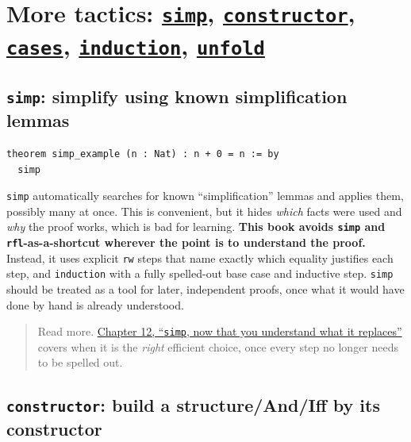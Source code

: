 \section{\texorpdfstring{More tactics: \href{https://lean-lang.org/doc/reference/latest/Tactic-Proofs/Tactic-Reference/}{\texttt{simp}}, \href{https://lean-lang.org/doc/reference/latest/Tactic-Proofs/Tactic-Reference/}{\texttt{constructor}}, \href{https://lean-lang.org/doc/reference/latest/Tactic-Proofs/Tactic-Reference/}{\texttt{cases}}, \href{https://lean-lang.org/doc/reference/latest/Tactic-Proofs/Tactic-Reference/}{\texttt{induction}}, \href{https://lean-lang.org/doc/reference/latest/Tactic-Proofs/Tactic-Reference/}{\texttt{unfold}}}{More tactics: simp, constructor, cases, induction, unfold}}\label{sec:04-tactics:04-more-tactics:1}

\subsection{\texorpdfstring{\texttt{simp}: simplify using known simplification lemmas}{simp: simplify using known simplification lemmas}}\label{sec:04-tactics:04-more-tactics:2}

\begin{lstlisting}
theorem simp_example (n : Nat) : n + 0 = n := by
  simp
\end{lstlisting}

\texttt{simp} automatically searches for known ``simplification'' lemmas and applies them, possibly many at once. This is convenient, but it hides \emph{which} facts were used and \emph{why} the proof works, which is bad for learning. \textbf{This book avoids \texttt{simp} and \texttt{rfl}-as-a-shortcut wherever the point is to understand the proof.} Instead, it uses explicit \texttt{rw} steps that name exactly which equality justifies each step, and \texttt{induction} with a fully spelled-out base case and inductive step. \texttt{simp} should be treated as a tool for later, independent proofs, once what it would have done by hand is already understood.

\begin{quote}
Read more. \hyperref[sec:12-working-efficiently:03-simp:1]{Chapter 12, ``\texttt{simp}, now that you understand what it replaces''} covers when it is the \emph{right} efficient choice, once every step no longer needs to be spelled out.
\end{quote}

\subsection{\texorpdfstring{\texttt{constructor}: build a structure/And/Iff by its constructor}{constructor: build a structure/And/Iff by its constructor}}\label{sec:04-tactics:04-more-tactics:3}

